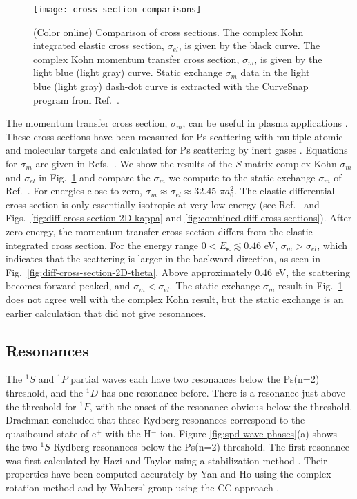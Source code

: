 \documentclass[preprint,showpacs,showkeys,preprintnumbers,amsmath,amssymb,longbibliography,pra,aps]{revtex4-1}
\begin{document}
{\begin{figure}[H]
	\centering
	\texttt{[image: cross-section-comparisons]}
	\caption{(Color online) Comparison of cross sections. The complex Kohn integrated
elastic cross section, $\sigma_{el}$, is given by the black curve. The complex
Kohn momentum transfer cross section, $\sigma_m$, is given by the
light blue (light gray) curve. Static exchange $\sigma_m$ data in the light blue
(light gray) dash-dot curve is extracted with the CurveSnap program \cite{CurveSnap}
from Ref.~\cite{Hara1975}.}
	\label{fig:cross-section-comparisons}
\end{figure}

The momentum transfer cross section, $\sigma_m$, can be useful in plasma applications
\cite{Wang2014, McEachran2014}. These cross sections have been measured for Ps
scattering with multiple atomic and molecular targets
\cite{Nagashima1998,Saito2003,Skalsey1998} and calculated
for Ps scattering by inert gases \cite{Blackwood2002c}. 
Equations for $\sigma_m$ are given
in Refs.~\cite{Bransden2003,Massey1969}.
We show the results of the $S$-matrix complex Kohn $\sigma_m$ and $\sigma_{el}$ in
Fig.~\ref{fig:cross-section-comparisons} and compare the $\sigma_m$
we compute to the
static exchange $\sigma_m$ of Ref.~\cite{Hara1975}.
For energies close to zero,
$\sigma_m \approx \sigma_{el} \approx 32.45$ $\pi a_0^2$.
The elastic differential cross section is only essentially isotropic at
very low energy (see Ref.~\cite{Blackwood2002c} and
Figs.~\ref{fig:diff-cross-section-2D-kappa} and \ref{fig:combined-diff-cross-sections}).
After zero energy, the momentum transfer cross section differs from the
elastic integrated cross section. For the energy range
$0 < E_{\bm \kappa} \lesssim 0.46$ eV, $\sigma_m > \sigma_{el}$,
which indicates that the scattering is larger in the backward 
direction, as seen in Fig.~\ref{fig:diff-cross-section-2D-theta}.
Above approximately 0.46 eV, the scattering
becomes forward peaked, and $\sigma_m < \sigma_{el}$. The static
exchange $\sigma_m$ result \cite{Hara1975} in Fig.~\ref{fig:cross-section-comparisons}
does not agree well with the
complex Kohn result, but the static exchange is an earlier calculation 
that did not give resonances.


\subsection{Resonances}
\label{sec:Resonances}

The $^1S$ and $^1P$ partial waves each have two resonances below the Ps(n=2) 
threshold, and the $^1D$ has one resonance before. There is a resonance just 
above the threshold for $^1F$, with the onset of the resonance obvious below the 
threshold. Drachman \cite{Drachman1979} concluded that these Rydberg 
resonances correspond to the quasibound state of e$^+$ with the H$^-$ ion.
Figure \ref{fig:spd-wave-phases}(a) shows the 
two $^1S$ Rydberg resonances below the Ps(n=2) threshold. The first resonance 
 was first 
calculated by Hazi and Taylor using a stabilization method \cite{Hazi1970}. 
Their properties have been computed accurately by Yan and Ho using the complex 
rotation method \cite{Yan1999} and by Walters' group using the CC 
approach \cite{Walters2004}.

}
\end{document}
